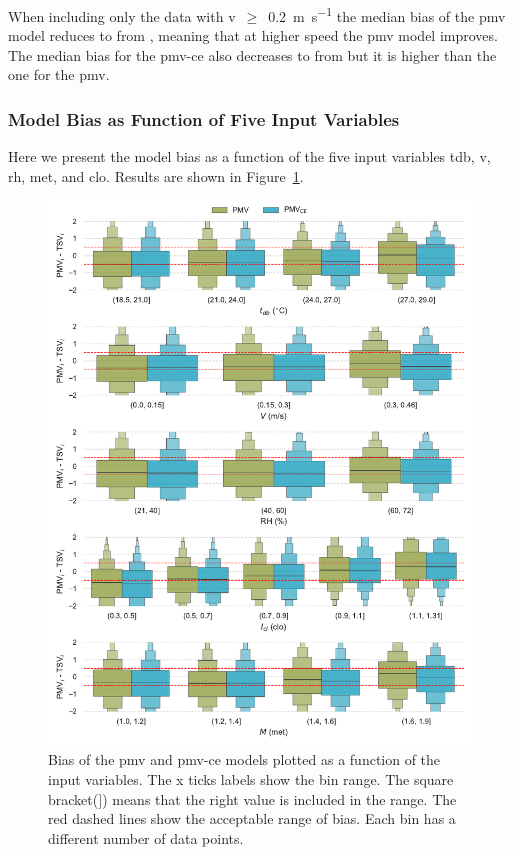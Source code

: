 When including only the data with \ac{v}~$\geq$~\qty{0.2}{\m\per\s} the median bias of the \ac{pmv} model reduces to  from , meaning that at higher speed the \ac{pmv} model improves.
The median bias for the \ac{pmv-ce} also decreases to  from  but it is higher than the one for the \ac{pmv}.

\subsubsection{Model Bias as Function of Five Input Variables}\label{subsubsec:model-bias-variable}
Here we present the model bias as a function of the five input variables \ac{tdb}, \ac{v}, \ac{rh}, \ac{met}, and \ac{clo}.
Results are shown in Figure~\ref{fig:bias_models}.
\begin{figure}[htb!]
    \centering
    \includegraphics[width=\textwidth]{figures/bias_models}
    \caption{Bias of the \ac{pmv} and \ac{pmv-ce} models plotted as a function of the input variables.
    The x ticks labels show the bin range.
    The square bracket($]$) means that the right value is included in the range.
    The red dashed lines show the acceptable range of bias.
    Each bin has a different number of data points.
    }
    \label{fig:bias_models}
\end{figure}

